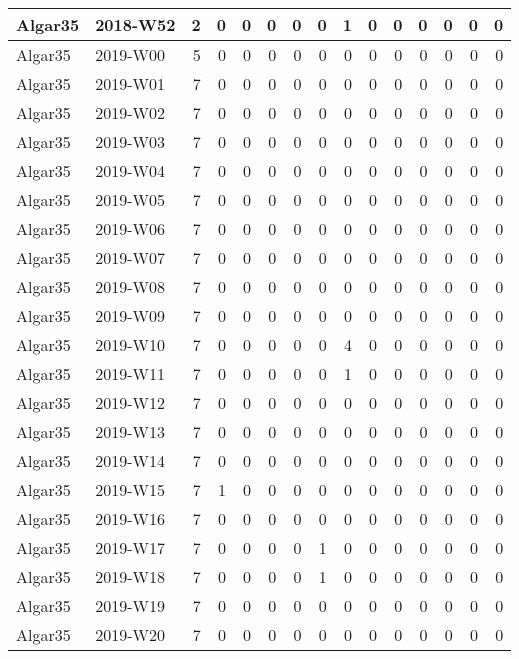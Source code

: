 \documentclass[]{book}
\begin{document}
\begin{table}
\begin{tabular}[t]{l|l|r|r|r|r|r|r|r|r|r|r|r|r|r}
\hline
Algar35 & 2018-W52 & 2 & 0 & 0 & 0 & 0 & 0 & 1 & 0 & 0 & 0 & 0 & 0 & 0\\
\hline
Algar35 & 2019-W00 & 5 & 0 & 0 & 0 & 0 & 0 & 0 & 0 & 0 & 0 & 0 & 0 & 0\\
\hline
Algar35 & 2019-W01 & 7 & 0 & 0 & 0 & 0 & 0 & 0 & 0 & 0 & 0 & 0 & 0 & 0\\
\hline
Algar35 & 2019-W02 & 7 & 0 & 0 & 0 & 0 & 0 & 0 & 0 & 0 & 0 & 0 & 0 & 0\\
\hline
Algar35 & 2019-W03 & 7 & 0 & 0 & 0 & 0 & 0 & 0 & 0 & 0 & 0 & 0 & 0 & 0\\
\hline
Algar35 & 2019-W04 & 7 & 0 & 0 & 0 & 0 & 0 & 0 & 0 & 0 & 0 & 0 & 0 & 0\\
\hline
Algar35 & 2019-W05 & 7 & 0 & 0 & 0 & 0 & 0 & 0 & 0 & 0 & 0 & 0 & 0 & 0\\
\hline
Algar35 & 2019-W06 & 7 & 0 & 0 & 0 & 0 & 0 & 0 & 0 & 0 & 0 & 0 & 0 & 0\\
\hline
Algar35 & 2019-W07 & 7 & 0 & 0 & 0 & 0 & 0 & 0 & 0 & 0 & 0 & 0 & 0 & 0\\
\hline
Algar35 & 2019-W08 & 7 & 0 & 0 & 0 & 0 & 0 & 0 & 0 & 0 & 0 & 0 & 0 & 0\\
\hline
Algar35 & 2019-W09 & 7 & 0 & 0 & 0 & 0 & 0 & 0 & 0 & 0 & 0 & 0 & 0 & 0\\
\hline
Algar35 & 2019-W10 & 7 & 0 & 0 & 0 & 0 & 0 & 4 & 0 & 0 & 0 & 0 & 0 & 0\\
\hline
Algar35 & 2019-W11 & 7 & 0 & 0 & 0 & 0 & 0 & 1 & 0 & 0 & 0 & 0 & 0 & 0\\
\hline
Algar35 & 2019-W12 & 7 & 0 & 0 & 0 & 0 & 0 & 0 & 0 & 0 & 0 & 0 & 0 & 0\\
\hline
Algar35 & 2019-W13 & 7 & 0 & 0 & 0 & 0 & 0 & 0 & 0 & 0 & 0 & 0 & 0 & 0\\
\hline
Algar35 & 2019-W14 & 7 & 0 & 0 & 0 & 0 & 0 & 0 & 0 & 0 & 0 & 0 & 0 & 0\\
\hline
Algar35 & 2019-W15 & 7 & 1 & 0 & 0 & 0 & 0 & 0 & 0 & 0 & 0 & 0 & 0 & 0\\
\hline
Algar35 & 2019-W16 & 7 & 0 & 0 & 0 & 0 & 0 & 0 & 0 & 0 & 0 & 0 & 0 & 0\\
\hline
Algar35 & 2019-W17 & 7 & 0 & 0 & 0 & 0 & 1 & 0 & 0 & 0 & 0 & 0 & 0 & 0\\
\hline
Algar35 & 2019-W18 & 7 & 0 & 0 & 0 & 0 & 1 & 0 & 0 & 0 & 0 & 0 & 0 & 0\\
\hline
Algar35 & 2019-W19 & 7 & 0 & 0 & 0 & 0 & 0 & 0 & 0 & 0 & 0 & 0 & 0 & 0\\
\hline
Algar35 & 2019-W20 & 7 & 0 & 0 & 0 & 0 & 0 & 0 & 0 & 0 & 0 & 0 & 0 & 0\\

\end{tabular}
\end{table}
\end{document}
